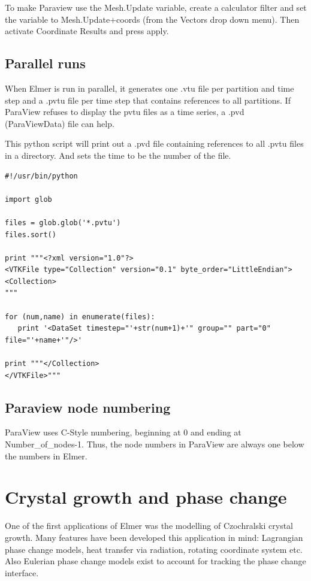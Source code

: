 To make Paraview use the Mesh.Update variable, create a calculator filter and set the variable to Mesh.Update+coords (from the Vectors drop down menu). Then activate Coordinate Results and press apply. 

\subsection{Parallel runs}

When Elmer is run in parallel, it generates one .vtu file per partition and time step and a .pvtu file per time step that contains references to all partitions. If ParaView refuses to display the pvtu files as a time series, a .pvd (ParaViewData) file can help.

This python script will print out a .pvd file containing references to all .pvtu files in a directory. And sets the time to be the number of the file.

\begin{verbatim}
#!/usr/bin/python

import glob

files = glob.glob('*.pvtu')
files.sort()

print """<?xml version="1.0"?>
<VTKFile type="Collection" version="0.1" byte_order="LittleEndian">
<Collection>
"""

for (num,name) in enumerate(files):
   print '<DataSet timestep="'+str(num+1)+'" group="" part="0" file="'+name+'"/>'

print """</Collection>
</VTKFile>"""
\end{verbatim}

\subsection{Paraview node numbering}

ParaView uses C-Style numbering, beginning at 0 and ending at Number\_of\_nodes-1. Thus, the node numbers in ParaView are always one below the numbers in Elmer. 

\section{Crystal growth and phase change}

One of the first applications of Elmer was the modelling of Czochralski crystal growth. Many features have been developed this application in mind: Lagrangian phase change models, heat transfer via radiation, rotating coordinate system etc. Also Eulerian phase change models exist to account for tracking the phase change interface.\\

